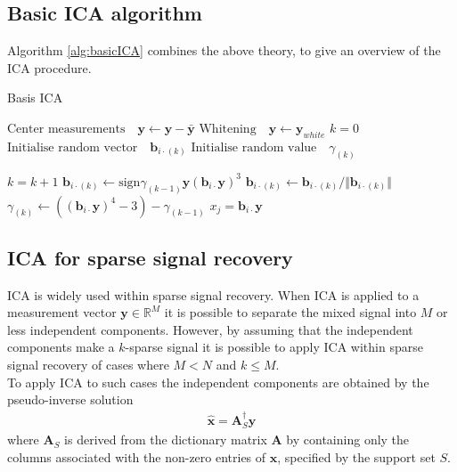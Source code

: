 \subsection{Basic ICA algorithm} 
Algorithm \ref{alg:basicICA} combines the above theory, to give an overview of the ICA procedure. 
\begin{algorithm}[H]
\caption{Basis ICA}
\begin{algorithmic}[1]
			\State $\text{Center measurements} \quad \textbf{y} \gets \textbf{y} - \bar{\textbf{y}}$
			\State $\text{Whitening} \quad \textbf{y}\gets \textbf{y}_{white}$ 
			\EndProcedure  
			\State
			\State$k=0$            
            \State$\text{Initialise random vector} \quad \textbf{b}_{i \cdot(k)}$ 
            \State$\text{Initialise random value} \quad \gamma_{(k)}$
            
               		\State $k = k+1$
                	\State $\textbf{b}_{i \cdot(k)} \gets \text{sign}\gamma_{(k-1)} \textbf{y}(\textbf{b}_{i \cdot} \textbf{y})^3$
                	\State $\textbf{b}_{i \cdot(k)} \gets \textbf{b}_{i \cdot(k)}/\Vert \textbf{b}_{i \cdot(k)} \Vert $ 
                	\State $\gamma_{(k)} \gets ((\textbf{b}_{i \cdot} \textbf{y})^4 - 3) - \gamma_{(k-1)} $
          		\EndWhile
          		\State $x_{j} = \textbf{b}_{i \cdot}\textbf{y}$
          	\EndFor
          	
            \EndProcedure
        \end{algorithmic} 
        \label{alg:basicICA}
\end{algorithm}

\subsection{ICA for sparse signal recovery}
ICA is widely used within sparse signal recovery.   
When ICA is applied to a measurement vector $\textbf{y}\in\mathbb{R}^{M}$ it is possible to separate the mixed signal into $M$ or less independent components. 
However, by assuming that the  independent components make a $k$-sparse signal it is possible to apply ICA within sparse signal recovery of cases where $M < N$ and $k \leq M$. 
\\
To apply ICA to such cases the independent components are obtained by the pseudo-inverse solution 
\begin{align*}
\hat{\mathbf{x}} = \mathbf{A}_S^{\dagger} \mathbf{y}
\end{align*}
where $\mathbf{A}_S$ is derived from the dictionary matrix $\mathbf{A}$ by containing only the columns associated with the non-zero entries of $\textbf{x}$, specified by the support set $S$. 

 


